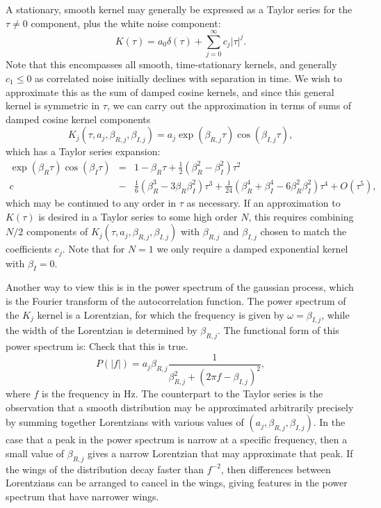 \documentclass[manuscript, letterpaper]{aastex6}
\makeatletter
\let\origsection\section
\renewcommand\section{\@ifstar{\starsection}{\nostarsection}}
\newcommand\nostarsection[1]{\sectionprelude\origsection{#1}}
\newcommand\starsection[1]{\sectionprelude\origsection*{#1}}
\newcommand\sectionprelude{\vspace{1em}}
\makeatother
\begin{document}
\section{Kernel components}

A stationary, smooth kernel may generally be expressed as a Taylor series for the $\tau \ne 0$ component,
plus the white noise component:
\begin{equation}
K(\tau) = a_0 \delta(\tau) +  \sum_{j=0}^\infty c_j \vert\tau\vert^j.
\end{equation}
Note that this encompasses all smooth, time-stationary kernels, and generally $c_1 \le 0$ as
correlated noise initially declines with separation in time.  We wish to approximate this
as the sum of damped cosine kernels, and since this general kernel is symmetric in $\tau$, we
can carry out the approximation in terms of sums of damped cosine kernel components
\begin{equation}
K_j(\tau,a_j,\beta_{R,j},\beta_{I,j}) = a_j \exp{(\beta_{R,j} \tau)}\cos{(\beta_{I,j} \tau)},
\end{equation}
which has a Taylor series expansion:
\begin{eqnarray}
\exp{(\beta_R \tau)}\cos{(\beta_I \tau)} &=& 1 - \beta_R \tau + \frac{1}{2}\left(\beta_R^2 - \beta_I^2\right)\tau^2 \\c &-&
\frac{1}{6} \left(\beta_R^3-3\beta_R\beta_I^2\right)\tau^3 + \frac{1}{24} \left(\beta_R^4+\beta_I^4-6\beta_R^2\beta_I^2\right) \tau^4+ O(\tau^5),
\end{eqnarray}
which may be continued to any order in $\tau$ as necessary.
If an approximation to $K(\tau)$ is desired in a Taylor series to some high order $N$, this
requires combining $N/2$ components of $K_j(\tau,a_j,\beta_{R,j},\beta_{I,j})$ with $\beta_{R,j}$ and $\beta_{I,j}$
chosen to match the coefficients $c_j$.  Note that for $N=1$ we only require a damped exponential
kernel with $\beta_I = 0$.

Another way to view this is in the power spectrum of the gaussian process, which is the
Fourier transform of the autocorrelation function.  The power spectrum of the $K_j$ kernel
is a Lorentzian, for which the frequency is given by $\omega = \beta_{I,j}$, while the
width of the Lorentzian is determined by $\beta_{R,j}$.  The functional form of this
power spectrum is: {\color{red} Check that this is true.}
\begin{equation}
P(\vert f\vert) = a_j \beta_{R,j} \frac{1}{\beta_{R,j}^2 + (2\pi f - \beta_{I,j})^2},
\end{equation}
where $f$ is the frequency in Hz.  The counterpart to the Taylor series is the observation
that a smooth distribution may be approximated arbitrarily precisely by summing together
Lorentzians with various values of $(a_j,\beta_{R,j},\beta_{I,j})$.  In the case that
a peak in the power spectrum is narrow at a specific frequency, then a small value of
$\beta_{R,j}$ gives a narrow Lorentzian that may approximate that peak.  If the wings
of the distribution decay faster than $f^{-2}$, then differences between Lorentzians
can be arranged to cancel in the wings, giving features in the power spectrum that have
narrower wings.
\end{document}
